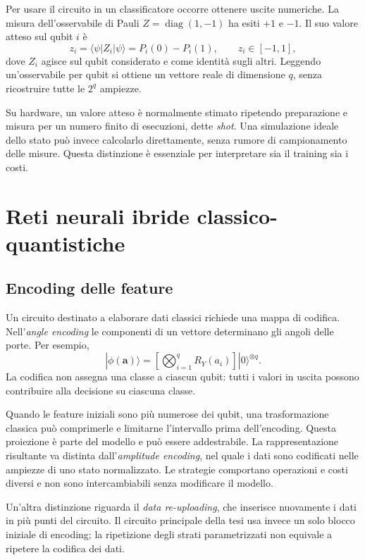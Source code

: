Per usare il circuito in un classificatore occorre ottenere uscite
numeriche. La misura dell'osservabile di Pauli
\(Z=\operatorname{diag}(1,-1)\) ha esiti \(+1\) e \(-1\). Il suo
valore atteso sul qubit \(i\) è
\begin{equation}
 z_i=\langle\psi|Z_i|\psi\rangle
     =P_i(0)-P_i(1),\qquad z_i\in[-1,1],
\end{equation}
dove \(Z_i\) agisce sul qubit considerato e come identità sugli altri.
Leggendo un'osservabile per qubit si ottiene un vettore reale di
dimensione \(q\), senza ricostruire tutte le \(2^q\) ampiezze.

Su hardware, un valore atteso è normalmente stimato ripetendo preparazione
e misura per un numero finito di esecuzioni, dette \emph{shot}. Una
simulazione ideale dello stato può invece calcolarlo direttamente, senza
rumore di campionamento delle misure. Questa distinzione è essenziale
per interpretare sia il training sia i costi.

\section{Reti neurali ibride classico-quantistiche}
\label{sec:fond-ibrido}

\subsection{Encoding delle feature}

Un circuito destinato a elaborare dati classici richiede una mappa di
codifica. Nell'\emph{angle encoding} le componenti di un vettore
determinano gli angoli delle porte. Per esempio,
\begin{equation}
 |\phi(\boldsymbol a)\rangle=
 \left[\bigotimes_{i=1}^{q}R_Y(a_i)\right]|0\rangle^{\otimes q}.
\end{equation}
La codifica non assegna una classe a ciascun qubit: tutti i valori in
uscita possono contribuire alla decisione su ciascuna classe.

Quando le feature iniziali sono più numerose dei qubit, una trasformazione
classica può comprimerle e limitarne l'intervallo prima dell'encoding.
Questa proiezione è parte del modello e può essere addestrabile.
La rappresentazione risultante va distinta dall'\emph{amplitude encoding},
nel quale i dati sono codificati nelle ampiezze di uno stato normalizzato.
Le strategie comportano operazioni e costi diversi e non sono
intercambiabili senza modificare il modello.

Un'altra distinzione riguarda il \emph{data re-uploading}, che inserisce
nuovamente i dati in più punti del circuito. Il circuito principale
della tesi usa invece un solo blocco iniziale di encoding; la ripetizione
degli strati parametrizzati non equivale a ripetere la codifica dei dati.

